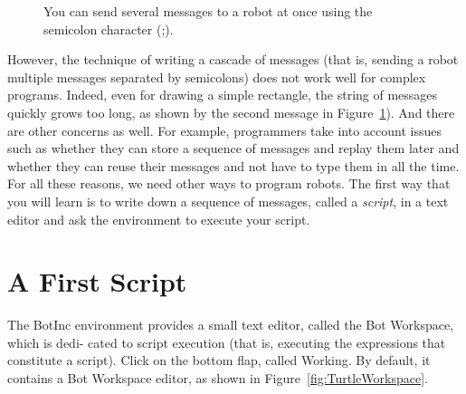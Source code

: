 \documentclass[a4paper,10pt,twoside]{book}
\begin{document}
\begin{figure}[!h]
\caption{You can send several messages to a robot at once using the semicolon character (;). \label{fig:cascading}}
\end{figure}


However, the technique of writing a cascade of messages (that is, sending a robot multiple messages separated by semicolons) does not work well for complex programs. Indeed, 
even for drawing a simple rectangle, the string of messages quickly grows too long, as shown 
by the second message in Figure~\ref{fig:cascading}). And there are other concerns as well. For example, programmers take into account issues such as whether they can store a sequence of messages and replay them later and whether they can reuse their messages and not have to type them in all the time. For all these reasons, we need other ways to program robots. The first way that you will learn is to write down a sequence of messages, called a \emph{script}, in a text editor and ask the environment to execute your script. 

\section{A First Script}

The BotInc environment provides a small text editor, called the Bot Workspace, which is dedi- 
cated to script execution (that is, executing the expressions that constitute a script). Click on the bottom flap, called Working. By default, it contains a Bot Workspace editor, as shown in Figure~\ref{fig:TurtleWorkspace}. 
\end{document}
